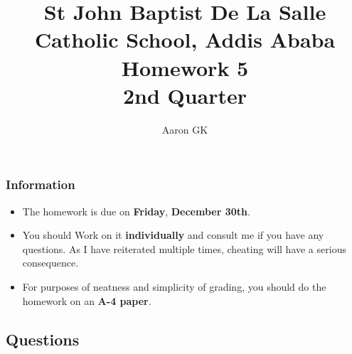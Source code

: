 \documentclass[9pt,addpoints]{exam}
\author{Aaron GK}
\begin{document}
	\title{St John Baptist De La Salle Catholic School, Addis Ababa\\
		\large Homework 5 \\
		2nd Quarter}
	\maketitle
	\begin{center}
		\subsubsection*{Information}
		\begin{itemize}
			\item The homework is due on \textbf{Friday}, \textbf{December 30th}.
			\item You should Work on it \textbf{individually} and consult me if you have any questions. As I have reiterated multiple times, cheating will have a serious consequence.
			\item For purposes of neatness and simplicity of grading, you should do the homework on an \textbf{A-4 paper}.
		\end{itemize}
	\end{center}
	\begin{center}
		\subsection*{Questions}
	\end{center}
	
\end{document}
